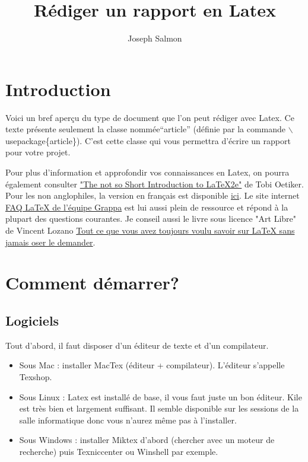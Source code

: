\documentclass[11pt]{article}
\title{Rédiger un rapport en Latex}
\author{Joseph Salmon}
\date {}
\theoremstyle{remark}
\theoremstyle{definition}
\begin{document}
\maketitle
\tableofcontents
\section{Introduction}

Voici un bref aperçu du type de document que l'on peut rédiger avec  Latex.
Ce texte  présente seulement la classe nommée``article'' (définie par la commande $\backslash$usepackage\{article\}). C'est cette classe  qui vous permettra d'écrire un rapport pour votre projet.


Pour plus d'information et approfondir vos connaissances en Latex, on pourra également consulter   \href{http://tobi.oetiker.ch/lshort/}{"The not so Short Introduction to LaTeX2e"} de Tobi Oetiker. Pour les non anglophiles, la version  en français est disponible  \href{http://www.laas.fr/~matthieu/cours/latex2e/}{ici}. Le site internet \href{http://www.grappa.univ-lille3.fr/FAQ-LaTeX/}{FAQ LaTeX de l'équipe Grappa} est lui aussi plein de ressource et répond à la plupart des questions courantes. Je conseil aussi le livre sous licence "Art Libre" de Vincent Lozano \href{http://www.framabook.org/latex.html}{Tout ce que vous avez toujours voulu savoir sur LaTeX sans jamais oser le demander}.



\section{Comment démarrer?}


\subsection{Logiciels}
Tout d'abord, il faut disposer d'un éditeur de texte et d'un compilateur.

\begin{itemize}
\item Sous Mac : installer MacTex  (éditeur + compilateur).
L'éditeur s'appelle Texshop.
\item Sous Linux : Latex est installé de base, il vous faut juste un bon éditeur. Kile est très bien et largement suffisant. Il semble disponible sur les sessions de la salle informatique donc vous n'aurez même pas à l'installer.
\item Sous Windows : installer Miktex d'abord (chercher avec un moteur de recherche) puis Texniccenter ou  Winshell par exemple.
\end{itemize}
\end{document}
